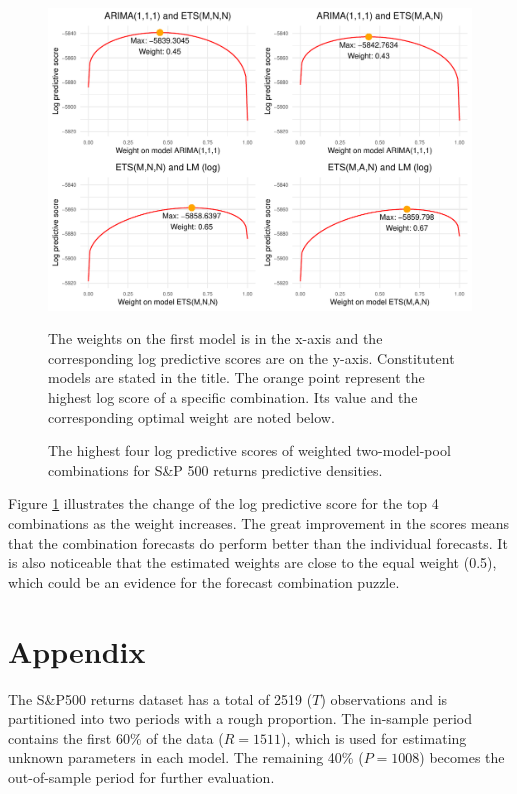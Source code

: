 \documentclass{monashthesis}
\begin{document}
\begin{figure}[ht]
\centering
\caption{The highest four log predictive scores of weighted two-model-pool combinations for S\&P 500 returns predictive densities. }
\includegraphics{figures/best4comb.pdf}
\begin{flushleft}
{\footnotesize The weights on the first model is in the x-axis and the corresponding log predictive scores are on the y-axis. Constitutent models are stated in the title. The orange point represent the highest log score of a specific combination. Its value and the corresponding optimal weight are noted below.}\\
\end{flushleft}
\label{fig:best4}
\end{figure}

Figure \ref{fig:best4} illustrates the change of the log predictive score for the top 4 combinations as the weight increases. The great improvement in the scores means that the combination forecasts do perform better than the individual forecasts. It is also noticeable that the estimated weights are close to the equal weight (0.5), which could be an evidence for the forecast combination puzzle.

\appendix

\hypertarget{appendix}{%
\chapter{Appendix}\label{appendix}}

The S\&P500 returns dataset has a total of 2519 (\(T\)) observations and is partitioned into two periods with a rough proportion. The in-sample period contains the first 60\% of the data (\(R = 1511\)), which is used for estimating unknown parameters in each model. The remaining 40\% (\(P = 1008\)) becomes the out-of-sample period for further evaluation.
\end{document}
